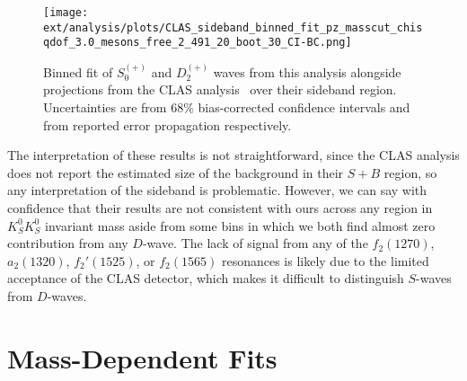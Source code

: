 \begin{figure}
  \begin{center}
    \texttt{[image: ext/analysis/plots/CLAS\_sideband\_binned\_fit\_pz\_masscut\_chisqdof\_3.0\_mesons\_free\_2\_491\_20\_boot\_30\_CI-BC.png]}
  \end{center}
  \caption{Binned fit of $S_0^{(+)}$ and $D_2^{(+)}$ waves from this analysis alongside projections from the CLAS analysis~\cite{Chandavar2018} over their sideband region. Uncertainties are from $68\%$ bias-corrected confidence intervals and from reported error propagation respectively.}\label{fig:clas-comparison-sideband}
\end{figure}

The interpretation of these results is not straightforward, since the CLAS analysis does not report the estimated size of the background in their $S+B$ region, so any interpretation of the sideband is problematic. However, we can say with confidence that their results are not consistent with ours across any region in $K_S^0K_S^0$ invariant mass aside from some bins in which we both find almost zero contribution from any $D$-wave. The lack of signal from any of the $f_2(1270)$, $a_2(1320)$, $f_2'(1525)$, or $f_2(1565)$ resonances is likely due to the limited acceptance of the CLAS detector, which makes it difficult to distinguish $S$-waves from $D$-waves.


\section{Mass-Dependent Fits}\label{sec:mass-dependent-fits}

